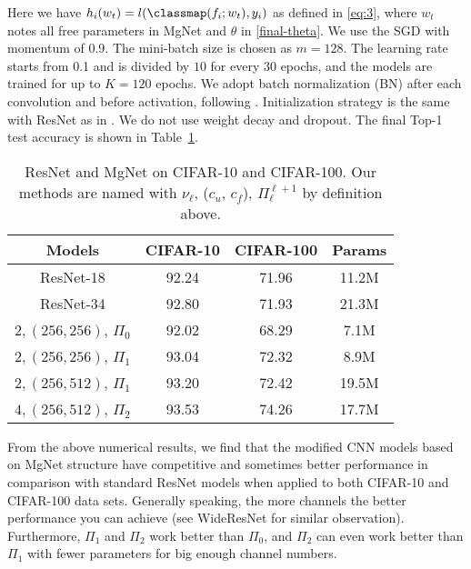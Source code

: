 Here we have $h_i(w_t) = l(\classmap(f_i;w_t),y_i)$ as defined in \eqref{eq:3}, where $w_t$ notes all free parameters in MgNet and $\theta$ in \eqref{final-theta}.
We use the SGD with momentum of 0.9. 
The mini-batch size is chosen as
$m=128$. The learning rate starts from 0.1 and is divided by $10$ for
every $30$ epochs, and the models are trained for up to $K=120$ epochs.
We adopt batch normalization (BN) after each convolution and before
activation, following \cite{ioffe2015batch}.  Initialization strategy
is the same with ResNet as in \cite{he2015delving}.  We
do not use weight decay and dropout.  The final Top-1 test accuracy is
shown in Table~\ref{comparison}.
\begin{table}[!htbp]
	\caption{ResNet and MgNet on CIFAR-10 and CIFAR-100. 
	Our methods are named with $\nu_\ell$, ($c_u$, $c_f$), $\Pi_\ell^{\ell+1}$ by definition above.}
	\label{comparison}
	\vskip 0.15in
	\begin{center}
				\begin{tabular}{cccc}
					\hline
					Models & CIFAR-10 & CIFAR-100 & Params \\
					\hline
					ResNet-18 & 92.24 & 71.96 & 11.2M   \\
					ResNet-34 & 92.80 & 71.93 & 21.3M   \\
					\hline
					$2, (256,256)$, $\Pi_0$ & 92.02 & 68.29 & 7.1M  \\
					$2, (256,256)$, $\Pi_1$ & 93.04 & 72.32 & 8.9M  \\
					$2, (256,512)$, $\Pi_1$ & 93.20 & 72.42 & 19.5M  \\ 
					$4, (256,512)$, $\Pi_2$ & 93.53& 74.26 & 17.7M  \\ 
					\hline
				\end{tabular} 
	\end{center}
	\vskip -0.1in
\end{table}

From the above numerical results, we find that the modified CNN models
based on MgNet structure have competitive and sometimes better
performance in comparison with standard ResNet models when applied to
both CIFAR-10 and CIFAR-100 data sets. Generally speaking, the more
channels the better performance you can achieve (see WideResNet
\cite{zagoruyko2016wide} for similar observation). Furthermore,
$\Pi_1$ and $\Pi_2$ work better than $\Pi_0$, and $\Pi_2$ can even
work better than $\Pi_1$ with fewer parameters for big enough 
channel numbers.


